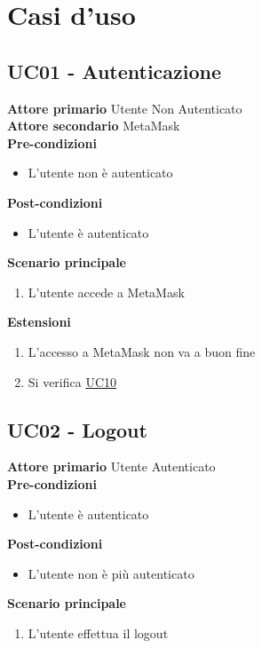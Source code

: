 \section{Casi d'uso}

\subsection{UC01 - Autenticazione}
\label{UC01}
\textbf{Attore primario} Utente Non Autenticato \\
\textbf{Attore secondario} MetaMask \\
\textbf{Pre-condizioni}
\begin{itemize}
    \item L'utente non è autenticato
\end{itemize}
\textbf{Post-condizioni}
\begin{itemize}
    \item L'utente è autenticato
\end{itemize}
\textbf{Scenario principale}
\begin{enumerate}
    \item L'utente accede a MetaMask
\end{enumerate}
\textbf{Estensioni}
\begin{enumerate}
    \item L'accesso a MetaMask non va a buon fine
    \item Si verifica \hyperref[UC10]{UC10}
\end{enumerate}

\subsection{UC02 - Logout}
\label{UC02}
\textbf{Attore primario} Utente Autenticato \\
\textbf{Pre-condizioni}
\begin{itemize}
    \item L'utente è autenticato
\end{itemize}
\textbf{Post-condizioni}
\begin{itemize}
    \item L'utente non è più autenticato
\end{itemize}
\textbf{Scenario principale}
\begin{enumerate}
    \item L'utente effettua il logout
\end{enumerate}

